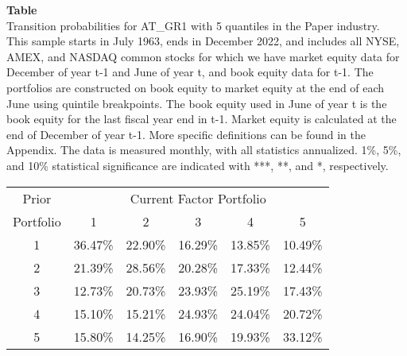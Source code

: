 \begin{table*}[ht!]
\raggedright
{}
\label{tab: transition_probs_AT_GR1_Paper_with_5_quantiles}
\textbf{Table \thetable} \\
Transition probabilities for AT_GR1 with 5 quantiles in the Paper industry. \\
\hspace*{1em}This sample starts in July 1963, ends in December 2022, and includes all NYSE, AMEX, and NASDAQ common stocks for which we have market equity data for December of year t-1 and June of year t, and book equity data for t-1. The portfolios are constructed on book equity to market equity at the end of each June using quintile breakpoints.  The book equity used in June of year t is the book equity for the last fiscal year end in t-1.  Market equity is calculated at the end of December of year t-1.  More specific definitions can be found in the Appendix.  The data is measured monthly, with all statistics annualized.  1\%, 5\%, and 10\% statistical significance are indicated with ***, **, and *, respectively. \\
\vspace{0.5em}
\centering
\begin{adjustbox}{max width=\textwidth}
\begin{tabular}{@{}cccccc@{}}
\toprule
Prior & \multicolumn{5}{c}{Current Factor Portfolio} \\
Portfolio & 1 & 2 & 3 & 4 & 5 \\
\midrule
1 & 36.47\% & 22.90\% & 16.29\% & 13.85\% & 10.49\% \\
2 & 21.39\% & 28.56\% & 20.28\% & 17.33\% & 12.44\% \\
3 & 12.73\% & 20.73\% & 23.93\% & 25.19\% & 17.43\% \\
4 & 15.10\% & 15.21\% & 24.93\% & 24.04\% & 20.72\% \\
5 & 15.80\% & 14.25\% & 16.90\% & 19.93\% & 33.12\% \\
\bottomrule
\end{tabular}
\end{adjustbox}
\end{table*}